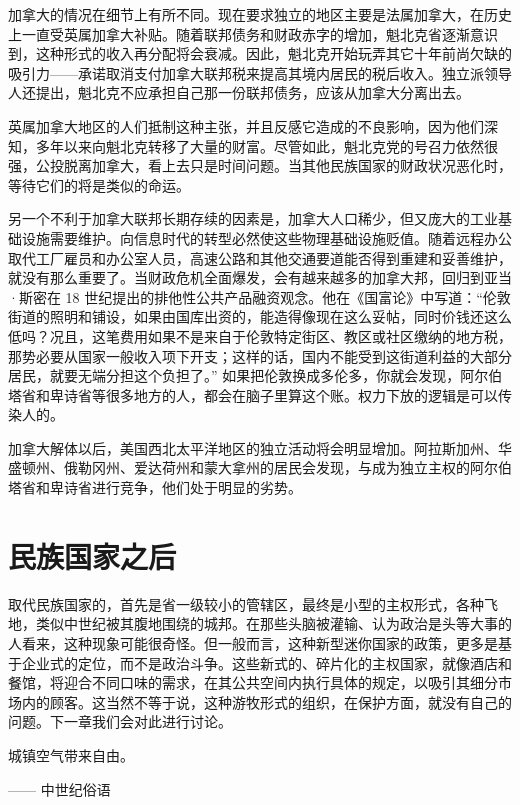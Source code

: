 加拿大的情况在细节上有所不同。现在要求独立的地区主要是法属加拿大，在历史上一直受英属加拿大补贴。随着联邦债务和财政赤字的增加，魁北克省逐渐意识到，这种形式的收入再分配将会衰减。因此，魁北克开始玩弄其它十年前尚欠缺的吸引力——承诺取消支付加拿大联邦税来提高其境内居民的税后收入。独立派领导人还提出，魁北克不应承担自己那一份联邦债务，应该从加拿大分离出去。

英属加拿大地区的人们抵制这种主张，并且反感它造成的不良影响，因为他们深知，多年以来向魁北克转移了大量的财富。尽管如此，魁北克党的号召力依然很强，公投脱离加拿大，看上去只是时间问题。当其他民族国家的财政状况恶化时，等待它们的将是类似的命运。

另一个不利于加拿大联邦长期存续的因素是，加拿大人口稀少，但又庞大的工业基础设施需要维护。向信息时代的转型必然使这些物理基础设施贬值。随着远程办公取代工厂雇员和办公室人员，高速公路和其他交通要道能否得到重建和妥善维护，就没有那么重要了。当财政危机全面爆发，会有越来越多的加拿大邦，回归到亚当·斯密在 18 世纪提出的排他性公共产品融资观念。他在《国富论》中写道：“伦敦街道的照明和铺设，如果由国库出资的，能造得像现在这么妥帖，同时价钱还这么低吗？况且，这笔费用如果不是来自于伦敦特定街区、教区或社区缴纳的地方税，那势必要从国家一般收入项下开支；这样的话，国内不能受到这街道利益的大部分居民，就要无端分担这个负担了。” 如果把伦敦换成多伦多，你就会发现，阿尔伯塔省和卑诗省等很多地方的人，都会在脑子里算这个账。权力下放的逻辑是可以传染人的。

加拿大解体以后，美国西北太平洋地区的独立活动将会明显增加。阿拉斯加州、华盛顿州、俄勒冈州、爱达荷州和蒙大拿州的居民会发现，与成为独立主权的阿尔伯塔省和卑诗省进行竞争，他们处于明显的劣势。

\section{民族国家之后}
取代民族国家的，首先是省一级较小的管辖区，最终是小型的主权形式，各种飞地，类似中世纪被其腹地围绕的城邦。在那些头脑被灌输、认为政治是头等大事的人看来，这种现象可能很奇怪。但一般而言，这种新型迷你国家的政策，更多是基于企业式的定位，而不是政治斗争。这些新式的、碎片化的主权国家，就像酒店和餐馆，将迎合不同口味的需求，在其公共空间内执行具体的规定，以吸引其细分市场内的顾客。这当然不等于说，这种游牧形式的组织，在保护方面，就没有自己的问题。下一章我们会对此进行讨论。

\begin{tcolorbox}
城镇空气带来自由。
\begin{flushright}
—— 中世纪俗语
\end{flushright}
\end{tcolorbox}

